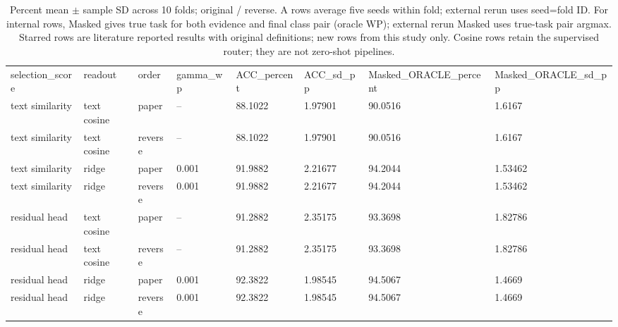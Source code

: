 \begin{table}
\centering
\caption{Percent mean $\pm$ sample SD across 10 folds; original / reverse. A rows average five seeds within fold; external rerun uses seed=fold ID. For internal rows, Masked gives true task for both evidence and final class pair (oracle WP); external rerun Masked uses true-task pair argmax. Starred rows are literature reported results with original definitions; new rows from this study only. Cosine rows retain the supervised router; they are not zero-shot pipelines.}
\begin{tabular}{llllllll}
\hline
selection\_score & readout & order & gamma\_wp & ACC\_percent & ACC\_sd\_pp & Masked\_ORACLE\_percent & Masked\_ORACLE\_sd\_pp \\
text similarity & text cosine & paper & -- & 88.1022 & 1.97901 & 90.0516 & 1.6167 \\
text similarity & text cosine & reverse & -- & 88.1022 & 1.97901 & 90.0516 & 1.6167 \\
text similarity & ridge & paper & 0.001 & 91.9882 & 2.21677 & 94.2044 & 1.53462 \\
text similarity & ridge & reverse & 0.001 & 91.9882 & 2.21677 & 94.2044 & 1.53462 \\
residual head & text cosine & paper & -- & 91.2882 & 2.35175 & 93.3698 & 1.82786 \\
residual head & text cosine & reverse & -- & 91.2882 & 2.35175 & 93.3698 & 1.82786 \\
residual head & ridge & paper & 0.001 & 92.3822 & 1.98545 & 94.5067 & 1.4669 \\
residual head & ridge & reverse & 0.001 & 92.3822 & 1.98545 & 94.5067 & 1.4669 \\
\hline
\end{tabular}
\end{table}

